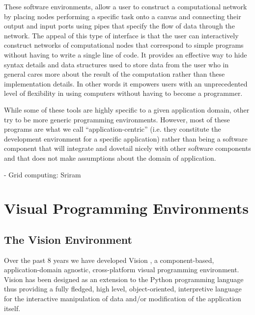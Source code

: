 \documentclass[conference]{IEEEtran}
\begin{document}
These software environments, allow a user to construct a computational
network by placing nodes performing a specific task onto a canvas and
connecting their output and input ports using pipes that specify the flow
of data through the network. The appeal of this type of interface is that
the user can interactively construct networks of computational nodes that
correspond to simple programs without having to write a single line of
code. It provides an effective way to hide syntax details and data
structures used to store data from the user who in general cares more about
the result of the computation rather than these implementation details. In
other words it empowers users with an unprecedented level of flexibility in
using computers without having to become a programmer.

While some of these tools are highly specific to a given application
domain, other try to be more generic programming environments. However,
most of these programs are what we call “application-centric” (i.e. they
constitute the development environment for a specific application) rather
than being a software component that will integrate and dovetail nicely
with other software components and that does not make assumptions about the
domain of application.


- Grid computing: Sriram

\section {Visual Programming Environments}

\subsection {The Vision Environment}



Over the past 8 years we have developed Vision \cite{viper}, a
component-based, application-domain agnostic, cross-platform visual
programming environment. Vision has been designed as an extension to the
Python programming language thus providing a fully fledged, high level,
object-oriented, interpretive language for the interactive manipulation of
data and/or modification of the application itself.
\end{document}
